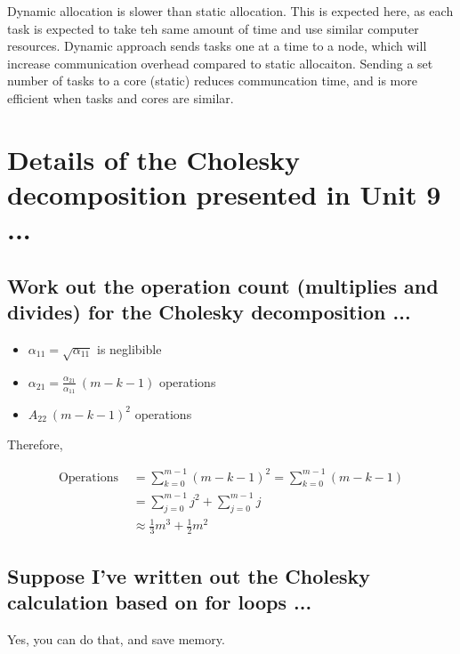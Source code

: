 \documentclass{article}\usepackage[]{graphicx}\usepackage[]{color}
\begin{document}
Dynamic allocation is slower than static allocation. This is expected here, as each task is expected to take teh same amount of time and use similar computer resources. Dynamic approach sends tasks one at a time to a node, which will increase communication overhead  compared to static allocaiton. Sending a set number of tasks to a core (static) reduces communcation time, and is more efficient when tasks and cores are similar.


\section{Details of the Cholesky decomposition presented in Unit 9 ...}

\subsection{Work out the operation count (multiplies and divides) for the Cholesky decomposition ...}

\begin{itemize}
    \item $\alpha_{11} = \sqrt{\alpha_{11}}$ is neglibible
    \item $\alpha_{21} = \frac{\alpha_{21}}{\alpha_{11}} ~ (m - k - 1)$ operations
    \item $A_{22} ~ (m-k-1)^2$ operations
\end{itemize}

Therefore, 

$$\begin{aligned}
\text{Operations } &= \sum_{k=0}^{m-1} (m-k-1)^2 = \sum_{k=0}^{m-1} (m - k - 1) \\
&= \sum_{j=0}^{m-1} j^2 + \sum_{j=0}^{m-1} j \\
&\approx \frac{1}{3}m^3 + \frac{1}{2}m^2 
\end{aligned}$$

\subsection{Suppose I’ve written out the Cholesky calculation based on for loops ...}

Yes, you can do that, and save memory.
\end{document}
